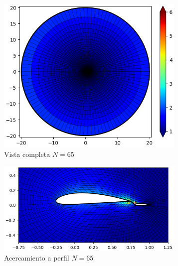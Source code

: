 \documentclass[letterpaper, openright, 12pt]{book}
\begin{document}
    \begin{figure}[htbp!]
        \centering
        \begin{subfigure}[c]{0.48\textwidth}
            \includegraphics[keepaspectratio, width=0.99\textwidth]
                {./img/naca4415_flap_n_65_aspect_far}
            \caption{Vista completa $N = 65$}
            \label{fig:naca4415_flap_n_65_aspect_far}
        \end{subfigure}
        \hfill
        \begin{subfigure}[c]{0.48\textwidth}
            \includegraphics[keepaspectratio, width=0.99\textwidth]
                {./img/naca4415_flap_n_65_aspect_close}
            \caption{Acercamiento a perfil $N = 65$}
            \label{fig:naca4415_flap_n_65_aspect_close}
        \end{subfigure}
        \begin{subfigure}[c]{0.48\textwidth}

\end{subfigure}
\end{figure}
\end{document}
